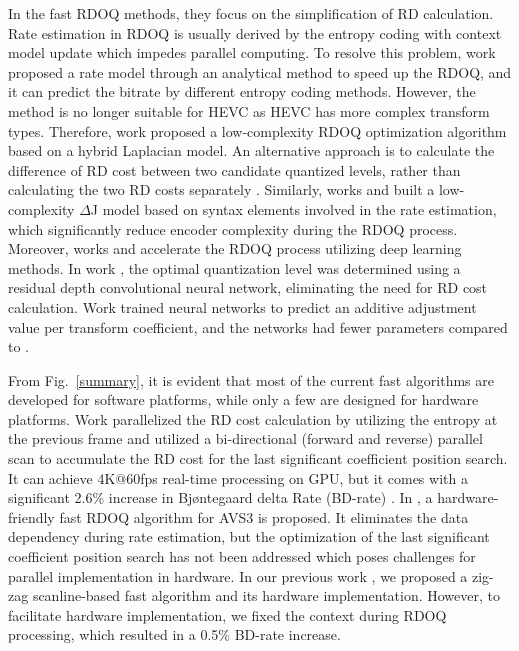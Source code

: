 \documentclass[lettersize,journal]{IEEEtran}
\begin{document}
In the fast RDOQ methods, they focus on the simplification of RD calculation. Rate estimation in RDOQ is usually derived by the entropy coding with context model update which impedes parallel computing. To resolve this problem, work \cite{huang2015efficientquantization} proposed a rate model through an analytical method to speed up the RDOQ, and it can predict the bitrate by different entropy coding methods. However, the method \cite{huang2015efficientquantization} is no longer suitable for HEVC as HEVC has more complex transform types. Therefore, work \cite{cui2017Laplacedistributionbased} proposed a low-complexity RDOQ optimization algorithm based on a hybrid Laplacian model. An alternative approach is to calculate the difference of RD cost between two candidate quantized levels, rather than calculating the two RD costs separately \cite{he2015highimplementationrdoq}. Similarly, works \cite{lee2015fastquantizationmethod} and \cite{wang2016improvedrdoq} built a low-complexity $\Delta$J model based on syntax elements involved in the rate estimation, which significantly reduce encoder complexity during the RDOQ process. Moreover, works \cite{canh2018rate} and \cite{kianfar2020parallelized} accelerate the RDOQ process utilizing deep learning methods. In work \cite{canh2018rate}, the optimal quantization level was determined using a residual depth convolutional neural network, eliminating the need for RD cost calculation. Work \cite{kianfar2020parallelized} trained neural networks to predict an additive adjustment value per transform coefficient, and the networks had fewer parameters compared to \cite{canh2018rate}. 

From Fig.~\ref{summary}, it is evident that most of the current fast algorithms are developed for software platforms, while only a few are designed for hardware platforms. Work \cite{igarashi2018parallelGPU} parallelized the RD cost calculation by utilizing the entropy at the previous frame and utilized a bi-directional (forward and reverse) parallel scan to accumulate the RD cost for the last significant coefficient position search. It can achieve 4K@60fps real-time processing on GPU, but it comes with a significant 2.6\% increase in Bjøntegaard delta Rate (BD-rate) \cite{bjontegaard2001calculationofPSNR}. In \cite{xu2022hardwarefriendlyforrdoq}, a hardware-friendly fast RDOQ algorithm for AVS3 is proposed. It eliminates the data dependency during rate estimation, but the optimization of the last significant coefficient position search has not been addressed which poses challenges for parallel implementation in hardware. In our previous work \cite{zhao2023scanline}, we proposed a zig-zag scanline-based fast algorithm and its hardware implementation. However, to facilitate hardware implementation, we fixed the context during RDOQ processing, which resulted in a 0.5\% BD-rate increase. 
\end{document}
